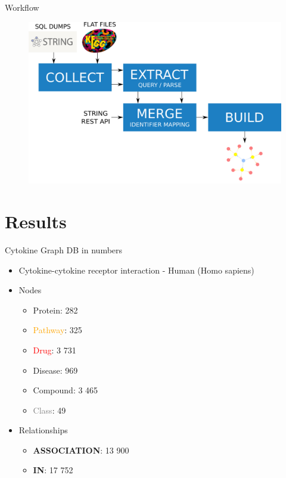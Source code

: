 \documentclass{beamer}
\begin{document}
\begin{frame}{Workflow}
\begin{figure}
    \centering
    \includegraphics[width=0.9\linewidth]{workflow2.png}
\end{figure}
\end{frame}

\section{Results}


\begin{frame}{Cytokine Graph DB in numbers}
\begin{itemize}
    \item Cytokine-cytokine receptor interaction - Human (Homo sapiens)
    \vfill
    \item Nodes
    \begin{itemize}
        \item \textcolor{protein}{Protein}: 282
        \item \textcolor{orange}{Pathway}: 325
        \item \textcolor{red}{Drug}: 3 731
        \item \textcolor{disease}{Disease}: 969
        \item \textcolor{compound}{Compound}: 3 465
        \item \textcolor{gray}{Class}: 49
    \end{itemize}
    \vfill
    \item Relationships
    \begin{itemize}
        \item \textbf{ASSOCIATION}: 13 900
        \item \textbf{IN}: 17 752
    \end{itemize}
\end{itemize}
\end{frame}
\end{document}
